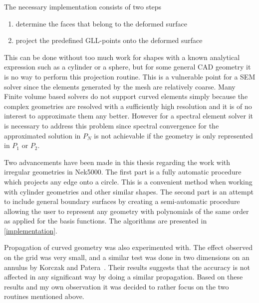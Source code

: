 The necessary implementation consists of two steps 
%
\begin{enumerate}
    \item determine the faces that belong to the deformed surface
    \item project the predefined GLL-points onto the deformed surface
\end{enumerate}
%
This can be done without too much work for shapes with a known analytical 
expression such as a cylinder or a sphere, but for some general CAD geometry 
it is no way to perform this projection routine. This is a vulnerable point 
for a SEM solver since the elements generated by the mesh are relatively coarse.
Many Finite volume based solvers do not support curved elements simply because the 
complex geometries are resolved with a sufficiently high resolution and it 
is of no interest to approximate them any better. However for a spectral element
solver it is necessary to address this problem since spectral convergence 
for the approximated solution in $P_N$ is not achievable 
if the geometry is only represented in $P_{1}$ or $P_{2}$.

Two advancements have been made in this thesis regarding the work with irregular geometries in Nek5000.
The first part is a fully automatic procedure which projects any edge onto a circle. This is a
convenient method when working with cylinder geometries and other similar shapes. The second part
is an attempt to include general boundary surfaces by creating a semi-automatic procedure allowing 
the user to represent any geometry with polynomials of the same order as applied for the basis functions.
The algorithms are presented in \cref{implementation}. 

Propagation of curved geometry was also experimented with. 
The effect observed on the grid was very small, and a similar test was 
done in two dimensions on an annulus by Korczak and Patera~\cite{Patera1986}. 
Their results suggests that the accuracy is not affected in any significant way 
by doing a similar propagation. Based on these results and my own observation 
it was decided to rather focus on the two routines mentioned above. 

